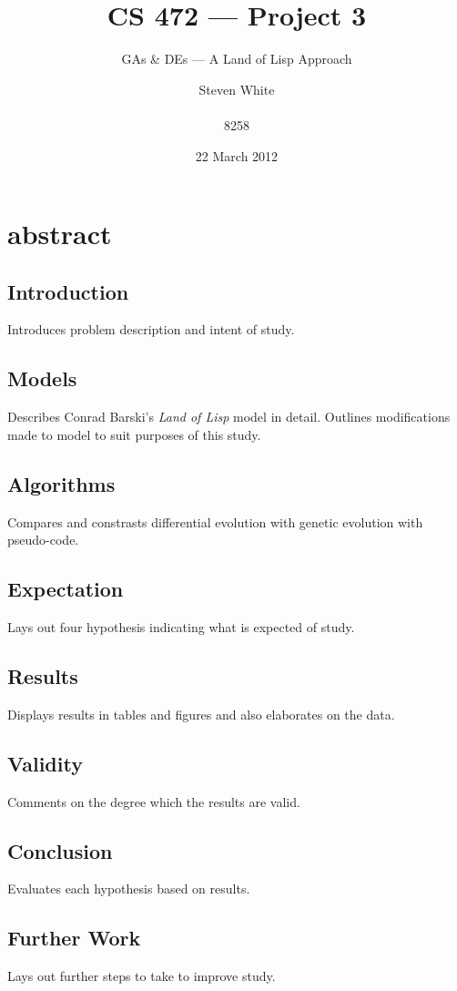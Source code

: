 \documentclass{sig-alternate}
\title{CS 472 --- Project 3}
\subtitle {GAs \& DEs --- A Land of Lisp Approach}
\author{
\alignauthor
Steven White \\
  \email{swhite24@mix.wvu.edu}\\
  8258
}
\begin{document}
\date{22 March 2012}

\maketitle
\section{abstract}

\subsection{Introduction}
Introduces problem description and intent of study.

\subsection{Models}
Describes Conrad Barski's \emph{Land of Lisp} model in detail.  Outlines modifications made to model to suit purposes of this study.

\subsection{Algorithms}
Compares and constrasts differential evolution with genetic evolution with pseudo-code.

\subsection{Expectation}
Lays out four hypothesis indicating what is expected of study.

\subsection{Results}
Displays results in tables and figures and also elaborates on the data.

\subsection{Validity}
Comments on the degree which the results are valid.

\subsection{Conclusion}
Evaluates each hypothesis based on results.

\subsection{Further Work}
Lays out further steps to take to improve study.
\end{document}
